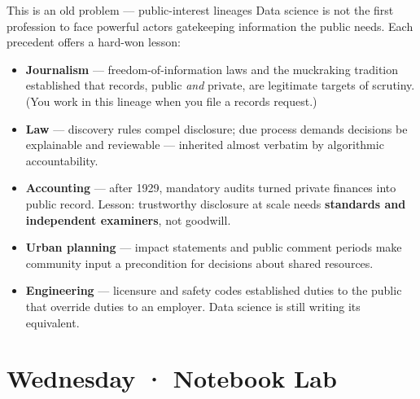 \documentclass[9pt,aspectratio=169]{beamer}
\begin{document}
\begin{frame}{This is an old problem --- public-interest lineages}
    Data science is not the first profession to face powerful actors gatekeeping information the public needs. Each precedent offers a hard-won lesson:
    \begin{itemize}\small
        \item \textbf{Journalism} --- freedom-of-information laws and the muckraking tradition established that records, public \emph{and} private, are legitimate targets of scrutiny. (You work in this lineage when you file a records request.)
        \item \textbf{Law} --- discovery rules compel disclosure; due process demands decisions be explainable and reviewable --- inherited almost verbatim by algorithmic accountability.
        \item \textbf{Accounting} --- after 1929, mandatory audits turned private finances into public record. Lesson: trustworthy disclosure at scale needs \textbf{standards and independent examiners}, not goodwill.
        \item \textbf{Urban planning} --- impact statements and public comment periods make community input a precondition for decisions about shared resources.
        \item \textbf{Engineering} --- licensure and safety codes established duties to the public that override duties to an employer. Data science is still writing its equivalent.
    \end{itemize}
\end{frame}

\section{Wednesday · Notebook Lab}
\end{document}
